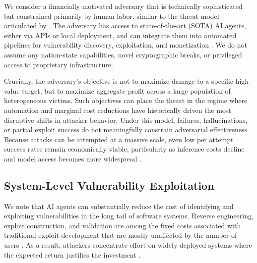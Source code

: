 \documentclass{article}
\theoremstyle{plain}
\theoremstyle{definition}
\theoremstyle{remark}
\begin{document}
We consider a financially motivated adversary that is technically sophisticated but constrained primarily by human labor, similar to the threat model articulated by \citet{carlini2025llms}. The adversary has access to state-of-the-art (SOTA) AI agents, either via APIs or local deployment, and can integrate them into automated pipelines for vulnerability discovery, exploitation, and monetization \citep{fang2024llm,zhu2024teams,jin2022exgen}. We do not assume any nation-state capabilities, novel cryptographic breaks, or privileged access to proprietary infrastructure.

Crucially, the adversary's objective is not to maximize damage to a specific high-value target, but to maximize aggregate profit across a large population of heterogeneous victims. Such objectives can place the threat in the regime where automation and marginal cost reductions have historically driven the most disruptive shifts in attacker behavior.
Under this model, failures, hallucinations, or partial exploit success do not meaningfully constrain adversarial effectiveness. Because attacks can be attempted at a massive scale, even low per attempt success rates remain economically viable, particularly as inference costs decline and model access becomes more widespread \citep{gundlach2025the}.

\subsection{System-Level Vulnerability Exploitation}

We note that AI agents can substantially reduce the cost of identifying and exploiting vulnerabilities in the long tail of software systems. Reverse engineering, exploit construction, and validation are among the fixed costs associated with traditional exploit development that are mostly unaffected by the number of users \citep{maynor2011metasploit,allodi2017economic}. As a result, attackers concentrate effort on widely deployed systems where the expected return justifies the investment \citep{cremonini2005evaluating,bier2007choosing}.
\end{document}

